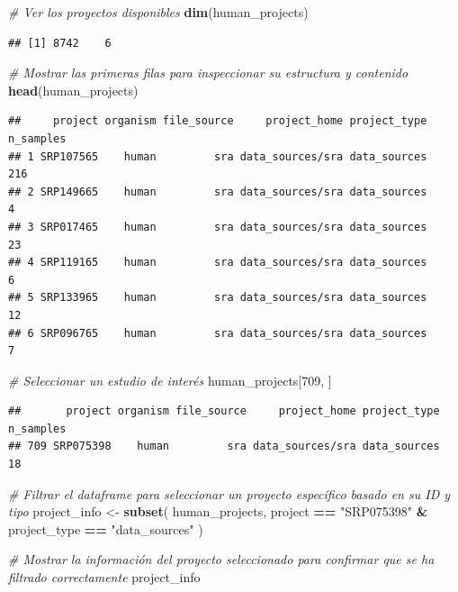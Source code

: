 \documentclass[
]{article}
\newenvironment{Shaded}{\begin{snugshade}}{\end{snugshade}}
\newcommand{\CommentTok}[1]{\textcolor[rgb]{0.56,0.35,0.01}{\textit{#1}}}
\newcommand{\DecValTok}[1]{\textcolor[rgb]{0.00,0.00,0.81}{#1}}
\newcommand{\FunctionTok}[1]{\textcolor[rgb]{0.13,0.29,0.53}{\textbf{#1}}}
\newcommand{\NormalTok}[1]{#1}
\newcommand{\OtherTok}[1]{\textcolor[rgb]{0.56,0.35,0.01}{#1}}
\newcommand{\SpecialCharTok}[1]{\textcolor[rgb]{0.81,0.36,0.00}{\textbf{#1}}}
\newcommand{\StringTok}[1]{\textcolor[rgb]{0.31,0.60,0.02}{#1}}
\begin{document}
\begin{Shaded}
\begin{Highlighting}[]
\CommentTok{\# Ver los proyectos disponibles}
\FunctionTok{dim}\NormalTok{(human\_projects)}
\end{Highlighting}
\end{Shaded}

\begin{verbatim}
## [1] 8742    6
\end{verbatim}

\begin{Shaded}
\begin{Highlighting}[]
\CommentTok{\# Mostrar las primeras filas para inspeccionar su estructura y contenido}
\FunctionTok{head}\NormalTok{(human\_projects)}
\end{Highlighting}
\end{Shaded}

\begin{verbatim}
##     project organism file_source     project_home project_type n_samples
## 1 SRP107565    human         sra data_sources/sra data_sources       216
## 2 SRP149665    human         sra data_sources/sra data_sources         4
## 3 SRP017465    human         sra data_sources/sra data_sources        23
## 4 SRP119165    human         sra data_sources/sra data_sources         6
## 5 SRP133965    human         sra data_sources/sra data_sources        12
## 6 SRP096765    human         sra data_sources/sra data_sources         7
\end{verbatim}

\begin{Shaded}
\begin{Highlighting}[]
\CommentTok{\# Seleccionar un estudio de interés}
\NormalTok{human\_projects[}\DecValTok{709}\NormalTok{, ]}
\end{Highlighting}
\end{Shaded}

\begin{verbatim}
##       project organism file_source     project_home project_type n_samples
## 709 SRP075398    human         sra data_sources/sra data_sources        18
\end{verbatim}

\begin{Shaded}
\begin{Highlighting}[]
\CommentTok{\# Filtrar el dataframe para seleccionar un proyecto específico basado en su ID y tipo}
\NormalTok{project\_info }\OtherTok{\textless{}{-}} \FunctionTok{subset}\NormalTok{(}
\NormalTok{  human\_projects,}
\NormalTok{  project }\SpecialCharTok{==} \StringTok{"SRP075398"} \SpecialCharTok{\&}\NormalTok{ project\_type }\SpecialCharTok{==} \StringTok{"data\_sources"}
\NormalTok{)}

\CommentTok{\# Mostrar la información del proyecto seleccionado para confirmar que se ha filtrado correctamente}
\NormalTok{project\_info}
\end{Highlighting}
\end{Shaded}
\end{document}
